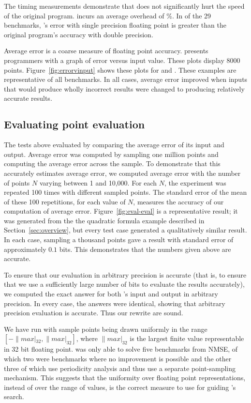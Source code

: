 \documentclass[paper.tex]{subfiles}
\begin{document}
The timing measurements demonstrate that \casio does not significantly
hurt the speed of the original program.  \casio incurs an average
overhead of \%.  In  of the 29 benchmarks, \casio's
error with single precision floating point is greater than the
original program's accuracy with double precision.

Average error is a coarse measure of floating point accuracy.  \casio
presents programmers with a graph of error versus input value.  These
plots display 8000 points.  Figure~\ref{fig:errorvinput} shows these
plots for  and .  These examples are
representative of all benchmarks.  In all cases, average error
improved when inputs that would produce wholly incorrect results were
changed to producing relatively accurate results.

\subsection{Evaluating point evaluation}\label{sec:eval-eval}

The tests above evaluated \casio by comparing the average error of its
input and output.  Average error was computed by sampling one million
points and computing the average error across the sample.  To
demonstrate that this accurately estimates average error, we computed
average error with the number of points $N$ varying between 1 and
10,000.  For each $N$, the experiment was repeated 100 times with
different sampled points.  The standard error of the mean of these 100
repetitions, for each value of $N$, measures the accuracy of our
computation of average error.  Figure~\ref{fig:eval-eval} is a
representative result; it was generated from the the quadratic formula
example described in Section~\ref{sec:overview}, but every test case
generated a qualitatively similar result.  In each case, sampling a
thousand points gave a result with standard error of approximately
$0.1$ bits.  This demonstrates that the numbers given above are
accurate.

To ensure that our evaluation in arbitrary precision is accurate (that
is, to ensure that we use a sufficiently large number of bits to
evaluate the results accurately), we computed the exact answer for
both \casio's input and output in arbitrary precision.  In every case,
the answers were identical, showing that arbitrary precision
evaluation is accurate. Thus our rewrite are sound.

We have run \casio with sample points being drawn
  uniformly in the range $[-\|max|_{32}, \|max|_{32}]$,
  where $\|max|_{32}$ is the largest finite value
  representable in 32 bit floating point.
\casio was only able to solve five benchmarks from NMSE,
  of which two were benchmarks where no improvement is possible
  and the other three of which use periodicity analysis
  and thus use a separate point-sampling mechanism.
This suggests that the uniformity over floating point representations,
  instead of over the range of values,
  is the correct measure to use for guiding \casio's search.
\end{document}
